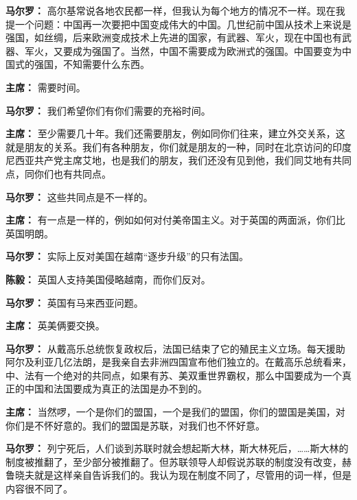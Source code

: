 \begin{duihua}
\item[\textbf{马尔罗：}] 高尔基常说各地农民都一样，但我认为每个地方的情况不一样。现在我提一个问题：中国再一次要把中国变成伟大的中国。几世纪前中国从技术上来说是强国，如丝绸，后来欧洲变成技术上先进的国家，有武器、军火，现在中国也有武器、军火，又要成为强国了。当然，中国不需要成为欧洲式的强国。中国要变为中国式的强国，不知需要什么东西。

\item[\textbf{主席：}] 需要时间。

\item[\textbf{马尔罗：}] 我们希望你们有你们需要的充裕时间。

\item[\textbf{主席：}] 至少需要几十年。我们还需要朋友，例如同你们往来，建立外交关系，这就是朋友的关系。我们有各种朋友，你们就是朋友的一种，同时在北京访问的印度尼西亚共产党主席艾地，也是我们的朋友，我们还没有见到他，我们同艾地有共同点，同你们也有共同点。

\item[\textbf{马尔罗：}] 这些共同点是不一样的。

\item[\textbf{主席：}] 有一点是一样的，例如如何对付美帝国主义。对于英国的两面派，你们比英国明朗。

\item[\textbf{马尔罗：}] 实际上反对美国在越南“逐步升级”的只有法国。

\item[\textbf{陈毅：}] 英国人支持美国侵略越南，而你们反对。

\item[\textbf{马尔罗：}] 英国有马来西亚问题。

\item[\textbf{主席：}] 英美俩要交换。

\item[\textbf{马尔罗：}] 从戴高乐总统恢复政权后，法国已结束了它的殖民主义立场。每天援助阿尔及利亚几亿法朗，是我亲自去非洲四国宣布他们独立的。在戴高乐总统看来，中、法有一个绝对的共同点，如果有苏、美双重世界霸权，那么中国要成为一个真正的中国和法国要成为真正的法国是办不到的。

\item[\textbf{主席：}] 当然啰，一个是你们的盟国，一个是我们的盟国，你们的盟国是美国，对你们是不怀好意的。我们的盟国是苏联，对我们也不怀好意。

\item[\textbf{马尔罗：}] 列宁死后，人们谈到苏联时就会想起斯大林，斯大林死后，……斯大林的制度被推翻了，至少部分被推翻了。但苏联领导人却假说苏联的制度没有改变，赫鲁晓夫就是这样亲自告诉我们的。我认为现在制度不同了，尽管用的词一样，但是内容很不同了。


\end{duihua}
